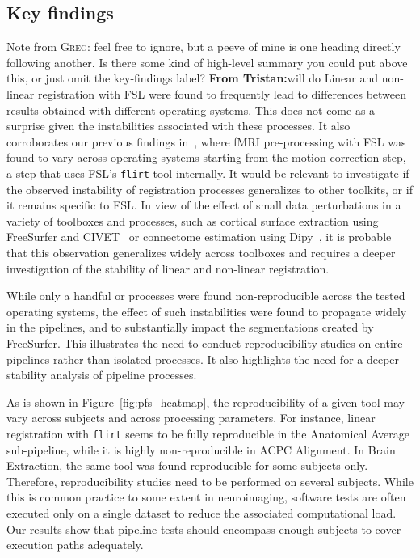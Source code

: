 \documentclass[a4paper,num-refs]{oup-contemporary}
\newcommand{\note}[2]{\color{blue}Note from \textsc{#1}: #2\color{black}}
\newcommand{\tristan}[1]{\color{orange}\textbf{From Tristan:}#1\color{black}}
\newcommand{\flirt}[0]{\texttt{flirt}\xspace}
\begin{document}
\subsection{Key findings}
\note{Greg}{feel free to ignore, but a peeve of mine is one heading directly following another. Is there some
kind of high-level summary you could put above this, or just omit the key-findings label?} \tristan{will do}
Linear and non-linear registration with FSL were found to
frequently lead to differences between results obtained with different
operating systems. This does not come as a surprise given the instabilities
associated with these processes. It also corroborates our previous findings
in~\cite{Glatard2015}, where fMRI pre-processing with FSL was found to vary across operating systems 
starting from the motion
correction step, a step that uses FSL's \flirt tool internally. It
would be relevant to investigate if the observed instability of
registration processes generalizes to other toolkits, or if it remains specific
to FSL. In view of the effect of small data perturbations in a variety of
toolboxes and processes, such as cortical surface extraction using
FreeSurfer and CIVET~\cite{Lewis2017-ll} or connectome estimation using
Dipy~\cite{kiar2019comparing}, it is probable that this observation
generalizes widely across toolboxes and requires a deeper investigation of
the stability of linear and non-linear registration.

While only a handful or processes were found non-reproducible across the
tested operating systems, the effect of such instabilities were found to
propagate widely in the pipelines, and to substantially impact the segmentations
created by FreeSurfer. This illustrates the need to conduct reproducibility studies
on entire pipelines rather than isolated processes. It also highlights the need 
for a deeper stability analysis of pipeline processes.

As is shown in Figure~\ref{fig:pfs_heatmap}, the reproducibility of
a given tool may vary across subjects and across processing parameters. For
instance, linear registration with \flirt seems to be fully reproducible in
the Anatomical Average sub-pipeline, while it is highly non-reproducible in
ACPC Alignment. In Brain Extraction, the same tool was found reproducible
for some subjects only. Therefore, reproducibility studies need to be
performed on several subjects. While this is common practice to some extent in neuroimaging, 
software tests are often executed only on a single dataset to reduce the
associated computational load. Our results show that pipeline tests should 
encompass enough subjects to cover execution paths adequately.
\end{document}
